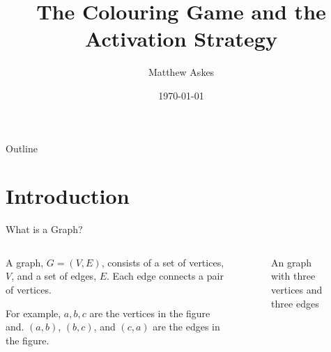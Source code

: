\documentclass{beamer}
\title[The Colouring Game and the Activ. Strat.]{The Colouring Game and the Activation Strategy}
\author{Matthew Askes}
\institute[Victoria University]{Victoria University of Wellington}
\date{\today}
\begin{document}
\frame{\titlepage}


\begin{frame}{Outline}
    \tableofcontents
\end{frame}

\section{Introduction}


\begin{frame}{\secname}{What is a Graph?}
      
    \begin{columns}
        \begin{column}{0.7\textwidth}
             A graph, $G=(V,E)$, consists of a set of vertices, $V$, and a set of edges, $E$. Each edge connects a pair of vertices. 
             
            \bigskip
            
            For example, $a,b,c$ are the vertices in the figure and. $(a,b)$, $(b,c)$, and $(c,a)$ are the edges in the figure.
        \end{column}
        \begin{column}{0.3\textwidth}  
            \begin{center}
                \begin{figure}[h]
                    \centering
                    \caption{An graph with three vertices and three edges}
                    \label{fig:k3}
                \end{figure}
            \end{center}
        \end{column}
    \end{columns}
    
\end{frame}
\end{document}
